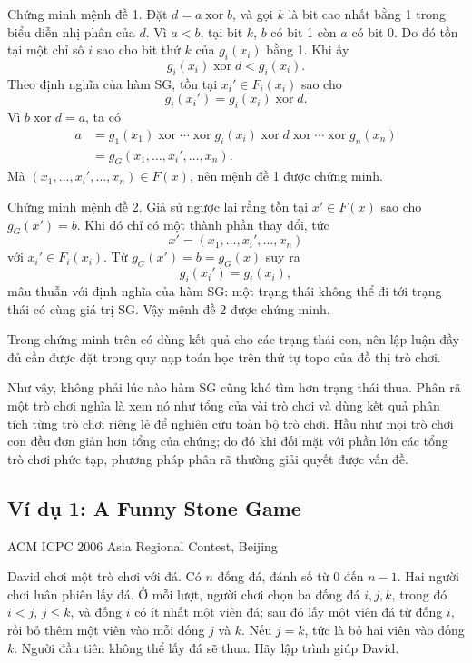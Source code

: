 \documentclass[11pt]{article}
\newcommand{\xor}{\mathbin{\operatorname{xor}}}
\begin{document}
Chứng minh mệnh đề 1. Đặt \(d=a\xor b\), và gọi \(k\) là bit cao nhất bằng 1
trong biểu diễn nhị phân của \(d\). Vì \(a<b\), tại bit \(k\), \(b\) có bit 1
còn \(a\) có bit 0. Do đó tồn tại một chỉ số \(i\) sao cho bit thứ \(k\) của
\(g_i(x_i)\) bằng 1. Khi ấy
\[
  g_i(x_i)\xor d < g_i(x_i).
\]
Theo định nghĩa của hàm SG, tồn tại \(x_i'\in F_i(x_i)\) sao cho
\[
  g_i(x_i')=g_i(x_i)\xor d.
\]
Vì \(b\xor d=a\), ta có
\[
\begin{aligned}
a
&=g_1(x_1)\xor\cdots\xor g_i(x_i)\xor d\xor\cdots\xor g_n(x_n)\\
&=g_G(x_1,\ldots,x_i',\ldots,x_n).
\end{aligned}
\]
Mà \((x_1,\ldots,x_i',\ldots,x_n)\in F(x)\), nên mệnh đề 1 được chứng minh.

Chứng minh mệnh đề 2. Giả sử ngược lại rằng tồn tại \(x'\in F(x)\) sao cho
\(g_G(x')=b\). Khi đó chỉ có một thành phần thay đổi, tức
\[
  x'=(x_1,\ldots,x_i',\ldots,x_n)
\]
với \(x_i'\in F_i(x_i)\). Từ \(g_G(x')=b=g_G(x)\) suy ra
\[
  g_i(x_i')=g_i(x_i),
\]
mâu thuẫn với định nghĩa của hàm SG: một trạng thái không thể đi tới trạng thái
có cùng giá trị SG. Vậy mệnh đề 2 được chứng minh.

Trong chứng minh trên có dùng kết quả cho các trạng thái con, nên lập luận đầy
đủ cần được đặt trong quy nạp toán học trên thứ tự topo của đồ thị trò chơi.

Như vậy, không phải lúc nào hàm SG cũng khó tìm hơn trạng thái thua. Phân rã
một trò chơi nghĩa là xem nó như tổng của vài trò chơi và dùng kết quả phân
tích từng trò chơi riêng lẻ để nghiên cứu toàn bộ trò chơi. Hầu như mọi trò
chơi con đều đơn giản hơn tổng của chúng; do đó khi đối mặt với phần lớn các
tổng trò chơi phức tạp, phương pháp phân rã thường giải quyết được vấn đề.

\subsection*{Ví dụ 1: A Funny Stone Game}

\begin{center}
ACM ICPC 2006 Asia Regional Contest, Beijing
\end{center}

David chơi một trò chơi với đá. Có \(n\) đống đá, đánh số từ \(0\) đến \(n-1\).
Hai người chơi luân phiên lấy đá. Ở mỗi lượt, người chơi chọn ba đống đá
\(i,j,k\), trong đó \(i<j\), \(j\le k\), và đống \(i\) có ít nhất một viên đá;
sau đó lấy một viên đá từ đống \(i\), rồi bỏ thêm một viên vào mỗi đống \(j\)
và \(k\). Nếu \(j=k\), tức là bỏ hai viên vào đống \(k\). Người đầu tiên không
thể lấy đá sẽ thua. Hãy lập trình giúp David.
\end{document}
